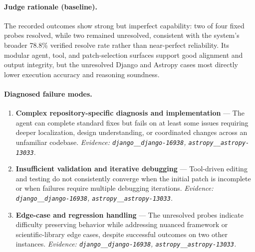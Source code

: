 \paragraph{Judge rationale (baseline).}
The recorded outcomes show strong but imperfect capability: two of four fixed probes resolved, while two remained unresolved, consistent with the system's broader 78.8\% verified resolve rate rather than near-perfect reliability. Its modular agent, tool, and patch-selection surfaces support good alignment and output integrity, but the unresolved Django and Astropy cases most directly lower execution accuracy and reasoning soundness.
\paragraph{Diagnosed failure modes.}\begin{enumerate}\itemsep1pt
\item \textbf{Complex repository-specific diagnosis and implementation} --- The agent can complete standard fixes but fails on at least some issues requiring deeper localization, design understanding, or coordinated changes across an unfamiliar codebase. \emph{Evidence: \texttt{django\_\_django-16938}, \texttt{astropy\_\_astropy-13033}.}
\item \textbf{Insufficient validation and iterative debugging} --- Tool-driven editing and testing do not consistently converge when the initial patch is incomplete or when failures require multiple debugging iterations. \emph{Evidence: \texttt{django\_\_django-16938}, \texttt{astropy\_\_astropy-13033}.}
\item \textbf{Edge-case and regression handling} --- The unresolved probes indicate difficulty preserving behavior while addressing nuanced framework or scientific-library edge cases, despite successful outcomes on two other instances. \emph{Evidence: \texttt{django\_\_django-16938}, \texttt{astropy\_\_astropy-13033}.}
\end{enumerate}
